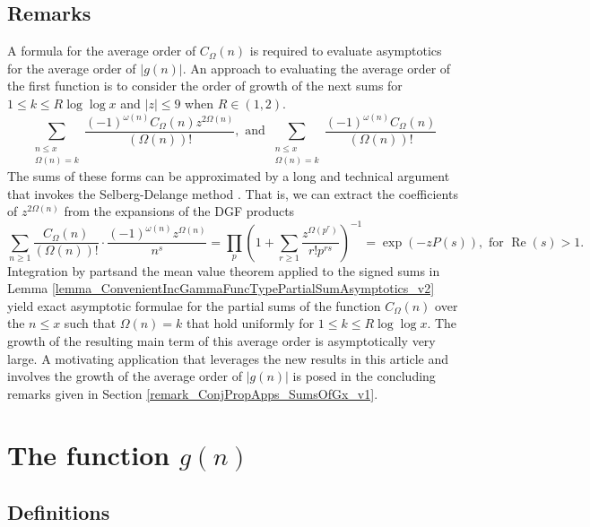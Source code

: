 \documentclass[11pt,reqno,a4letter]{article}
\newcommand{\hlocalref}[1]{\hyperref[#1]{\ref{#1}}}
\numberwithin{equation}{section}
\numberwithin{figure}{section}
\numberwithin{table}{section}
\theoremstyle{plain}
\numberwithin{theorem}{section}
\theoremstyle{definition}
\renewcommand{\Re}{\operatorname{Re}}
\begin{document}
\subsection{Remarks} 
\label{subSection_RemarksOnAvgOrderFor_COmegan_directly_SelbergDelangeMethod} 

A formula for the average order of $C_{\Omega}(n)$ is required 
to evaluate asymptotics for the average order of $|g(n)|$. 
An approach to evaluating the average order of the first function 
is to consider the order of growth of the next sums 
for $1 \leq k \leq R \log\log x$ and $|z| \leq 9$ when $R \in (1, 2)$. 
\[
\sum_{\substack{n \leq x \\ \Omega(n)=k}} \frac{(-1)^{\omega(n)} 
     C_{\Omega}(n) z^{2\Omega(n)}}{(\Omega(n))!}, \text{ and } 
     \sum_{\substack{n \leq x \\ \Omega(n)=k}} \frac{(-1)^{\omega(n)} 
     C_{\Omega}(n)}{(\Omega(n))!} 
\]
The sums of these forms can be approximated by a 
long and technical argument that invokes the Selberg-Delange method 
\cite[\S II.6.1]{TENENBAUM-PROBNUMT-METHODS} \cite[\S 7.4]{MV}. 
That is, we can extract the coefficients of $z^{2\Omega(n)}$ 
from the expansions of the DGF products 
\[
\sum_{n \geq 1} \frac{C_{\Omega}(n)}{(\Omega(n))!} \cdot 
     \frac{(-1)^{\omega(n)} z^{\Omega(n)}}{n^s} = \prod_p \left(1 + \sum_{r \geq 1} 
     \frac{z^{\Omega(p^r)}}{r! p^{rs}}\right)^{-1} 
     = \exp\left(-z P(s)\right), \text{ for } \Re(s) > 1. 
\]
Integration by partsand the mean value theorem applied to the 
signed sums in Lemma \hlocalref{lemma_ConvenientIncGammaFuncTypePartialSumAsymptotics_v2} 
yield exact asymptotic formulae for the partial sums of 
the function $C_{\Omega}(n)$ over the $n \leq x$ such that $\Omega(n) = k$ that hold 
uniformly for $1 \leq k \leq R \log\log x$. 
The growth of the resulting main term of this 
average order is asymptotically very large.
A motivating application that leverages the new results in this article and involves 
the growth of the average order of $|g(n)|$ is posed in 
the concluding remarks given in Section \hlocalref{remark_ConjPropApps_SumsOfGx_v1}. 

\section{The function $g(n)$} 
\label{Section_NewFormulasForgInvn_v2} 

\subsection{Definitions}
\end{document}
